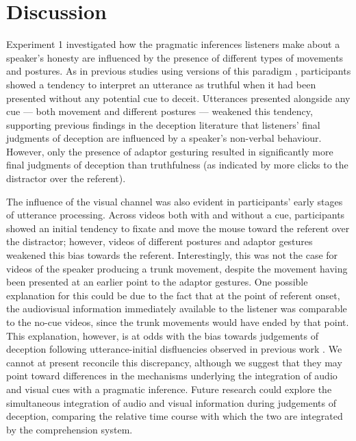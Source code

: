 \documentclass[a4paper,man,natbib]{apa6}
\begin{document}
\section{Discussion}
Experiment 1 investigated how the pragmatic inferences listeners make about a speaker's honesty are influenced by the presence of different types of movements and postures. 
As in previous studies using versions of this paradigm \citep{Loy2017, King2018}, participants showed a tendency to interpret an utterance as truthful when it had been presented without any potential cue to deceit.
Utterances presented alongside any cue --- both movement and different postures --- weakened this tendency, supporting previous findings in the deception literature that listeners' final judgments of deception are influenced by a speaker's non-verbal behaviour.
However, only the presence of adaptor gesturing resulted in significantly more final judgments of deception than truthfulness (as indicated by more clicks to the distractor over the referent).

The influence of the visual channel was also evident in participants' early stages of utterance processing. 
Across videos both with and without a cue, participants showed an initial tendency to fixate and move the mouse toward the referent over the distractor; however, videos of different postures and adaptor gestures weakened this bias towards the referent.
Interestingly, this was not the case for videos of the speaker producing a trunk movement, despite the movement having been presented at an earlier point to the adaptor gestures.
One possible explanation for this could be due to the fact that at the point of referent onset, the audiovisual information immediately available to the listener was comparable to the no-cue videos, since the trunk movements would have ended by that point.
This explanation, however, is at odds with the bias towards judgements of deception following utterance-initial disfluencies observed in previous work \citetext{\citet{Loy2017}, Experiment 1}.
We cannot at present reconcile this discrepancy, although we suggest that they may point toward differences in the mechanisms underlying the integration of audio and visual cues with a pragmatic inference.
Future research could explore the simultaneous integration of audio and visual information during judgements of deception, comparing the relative time course with which the two are integrated by the comprehension system.
\end{document}
